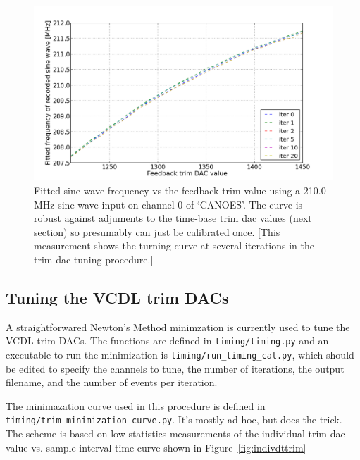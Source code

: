 \documentclass[11pt]{article}
\begin{document}
\begin{figure}[h!]
  \begin{center}
    \includegraphics[width=15cm]{fig/fbTrimScan.png}
  \end{center}
  \caption{Fitted sine-wave frequency vs the feedback trim value using a 210.0 MHz sine-wave input on channel 0 of `CANOES'. The curve is robust against adjuments to the time-base trim dac values (next section) so presumably can just be calibrated once. [This measurement shows the turning curve at several iterations in the trim-dac tuning procedure.]}
  \label{fig:tunefb}
\end{figure}


\subsection{Tuning the VCDL trim DACs}

A straightforwared Newton's Method minimzation is currently used to tune the VCDL trim DACs. The functions are defined in \verb!timing/timing.py! and
an executable to run the minimization is \verb!timing/run_timing_cal.py!, which should be edited to specify the channels to tune, the number of iterations,
the output filename, and the number of events per iteration.

The minimazation curve used in this procedure is defined in \verb!timing/trim_minimization_curve.py!. It's mostly ad-hoc, but does the trick. The scheme
is based on low-statistics measurements of the individual trim-dac-value vs. sample-interval-time curve shown in Figure~\ref{fig:indivdttrim}
\end{document}
